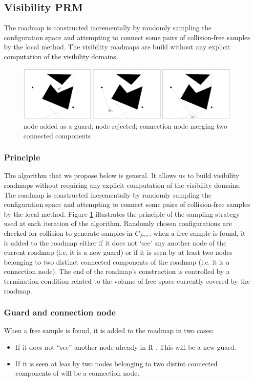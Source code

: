 \documentclass[11pt]{article}
\begin{document}
\subsection{Visibility PRM}
The roadmap is constructed incrementally by randomly sampling the configuration space and attempting to connect some pairs of collision-free samples by the local method.
The visibility roadmaps are build without any explicit computation of the visibility domains.
\begin{figure}[h]
\includegraphics{visibility_psm_visual}
\centering
\caption{node added as a guard; node rejected; connection node merging two connected components}
\label{fig:vispsm_visual}
\end{figure}

\subsubsection{Principle}
The algorithm that we propose below is general. It allows us to build visibility
roadmaps without requiring any explicit computation of the visibility domains.
The roadmap is constructed incrementally by randomly sampling the configuration
space and attempting to connect some pairs of collision-free samples by the
local method. Figure \ref{fig:vispsm_visual} illustrates the principle of the sampling strategy used at
each iteration of the algorithm. Randomly chosen configurations are checked for
collision to generate samples in $C_{free}$; when a free sample is found, it is added to
the roadmap either if it does not ‘see’ any another node of the current roadmap (i.e.
it is a new guard) or if it is seen by at least two nodes belonging to two distinct
connected components of the roadmap (i.e. it is a connection node). The end of
the roadmap’s construction is controlled by a termination condition related to the
volume of free space currently covered by the roadmap.

\subsubsection{Guard and connection node}
When a free sample is found, it is added to the roadmap in two cases:
\begin{itemize}
\item If it does not “see” another node already in R . This will be a new guard.
\item If it is seen at leas by two nodes belonging to two distint connected components of will be a connection node.
\end{itemize}
\end{document}
